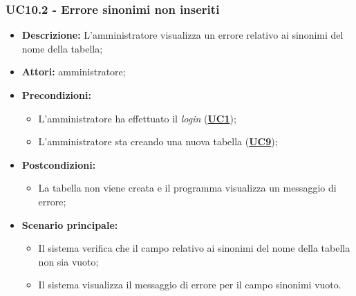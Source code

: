 \subsubsection{UC10.2 - Errore sinonimi non inseriti}
\label{sec:UC10.2}
\begin{itemize}
	\item \textbf{Descrizione:} L’amministratore visualizza un errore relativo ai sinonimi del nome della tabella;
	\item \textbf{Attori:} amministratore;
	\item \textbf{Precondizioni:} 
	\begin{itemize}
		\item L’amministratore ha effettuato il \textit{login} (\hyperref[sec:UC1]{\textbf{UC1}});
		\item L’amministratore sta creando una nuova tabella (\hyperref[sec:UC9]{\textbf{UC9}});
	\end{itemize}
	\item \textbf{Postcondizioni:} 
	\begin{itemize}
		\item La tabella non viene creata e il programma visualizza un messaggio di errore;
	\end{itemize}
	\item \textbf{Scenario principale:} 
	\begin{itemize}
		\item Il sistema verifica che il campo relativo ai sinonimi del nome della tabella non sia vuoto;
		\item Il sistema visualizza il messaggio di errore per il campo sinonimi vuoto.
	\end{itemize}
\end{itemize}


